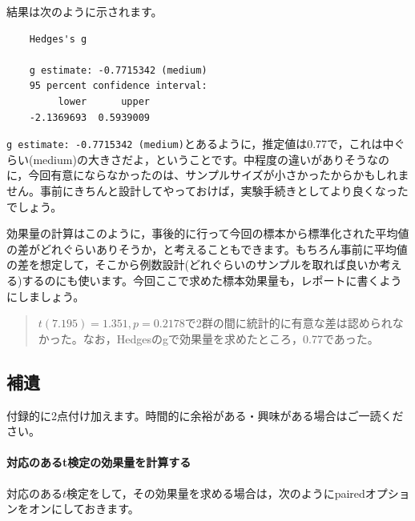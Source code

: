 \documentclass{ltjsbook}
\begin{document}
結果は次のように示されます。
\begin{tcolorbox}
\begin{verbatim}
    Hedges's g

    g estimate: -0.7715342 (medium)
    95 percent confidence interval:
         lower      upper 
    -2.1369693  0.5939009 
\end{verbatim}
\end{tcolorbox}

\texttt{g estimate: -0.7715342 (medium)}とあるように，推定値は0.77で，これは中ぐらい(medium)の大きさだよ，ということです。中程度の違いがありそうなのに，今回有意にならなかったのは、サンプルサイズが小さかったからかもしれません。事前にきちんと設計してやっておけば，実験手続きとしてより良くなったでしょう。

効果量の計算はこのように，事後的に行って今回の標本から標準化された平均値の差がどれぐらいありそうか，と考えることもできます。もちろん事前に平均値の差を想定して，そこから例数設計(どれぐらいのサンプルを取れば良いか考える)するのにも使います。今回ここで求めた標本効果量も，レポートに書くようにしましょう。

\begin{quote}
    $t(7.195)=1.351,p = 0.2178$で2群の間に統計的に有意な差は認められなかった。なお，Hedgesのgで効果量を求めたところ，0.77であった。
\end{quote}

\subsection{補遺}
付録的に2点付け加えます。時間的に余裕がある・興味がある場合はご一読ください。
\paragraph{対応のあるt検定の効果量を計算する}対応のある$t$検定をして，その効果量を求める場合は，次のようにpairedオプションをオンにしておきます。
\end{document}
